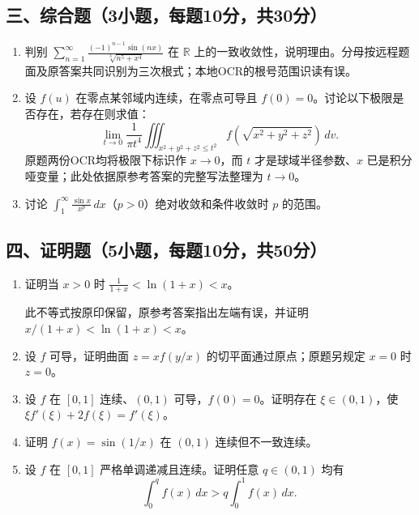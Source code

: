 \documentclass[11pt,fontset=fandol]{ctexart}
\begin{document}
\subsection{三、综合题（3小题，每题10分，共30分）}\label{ux4e09ux7efcux5408ux98983ux5c0fux9898ux6bcfux989810ux5206ux517130ux5206}

\begin{enumerate}
\def\labelenumi{\arabic{enumi}.}
\item
  判别
  \(\displaystyle\sum_{n=1}^\infty\frac{(-1)^{n-1}\sin(nx)}{\sqrt[3]{n^5+x^4}}\)
  在 \(\mathbb R\)
  上的一致收敛性，说明理由。分母按远程题面及原答案共同识别为三次根式；本地OCR的根号范围识读有误。
\item
  设 \(f(u)\) 在零点某邻域内连续，在零点可导且
  \(f(0)=0\)。讨论以下极限是否存在，若存在则求值： \[
  \lim_{t\to0}\frac1{\pi t^4}\iiint_{x^2+y^2+z^2\le t^2}
  f(\sqrt{x^2+y^2+z^2})\,dv.
  \] 原题两份OCR均将极限下标识作 \(x\to0\)，而 \(t\)
  才是球域半径参数、\(x\)
  已是积分哑变量；此处依据原参考答案的完整写法整理为 \(t\to0\)。
\item
  讨论
  \(\displaystyle\int_1^\infty\frac{\sin x}{x^p}\,dx\)（\(p>0\)）绝对收敛和条件收敛时
  \(p\) 的范围。
\end{enumerate}

\subsection{四、证明题（5小题，每题10分，共50分）}\label{ux56dbux8bc1ux660eux98985ux5c0fux9898ux6bcfux989810ux5206ux517150ux5206}

\begin{enumerate}
\def\labelenumi{\arabic{enumi}.}
\item
  证明当 \(x>0\) 时 \(\displaystyle\frac1{1+x}<\ln(1+x)<x\)。

  此不等式按原印保留，原参考答案指出左端有误，并证明
  \(x/(1+x)<\ln(1+x)<x\)。
\item
  设 \(f\) 可导，证明曲面 \(z=xf(y/x)\) 的切平面通过原点；原题另规定
  \(x=0\) 时 \(z=0\)。
\item
  设 \(f\) 在 \([0,1]\) 连续、\((0,1)\) 可导，\(f(0)=0\)。证明存在
  \(\xi\in(0,1)\)，使 \(\xi f'(\xi)+2f(\xi)=f'(\xi)\)。
\item
  证明 \(f(x)=\sin(1/x)\) 在 \((0,1)\) 连续但不一致连续。
\item
  设 \(f\) 在 \([0,1]\) 严格单调递减且连续。证明任意 \(q\in(0,1)\) 均有
  \[
  \int_0^qf(x)\,dx>q\int_0^1f(x)\,dx.
  \]
\end{enumerate}
\end{document}
